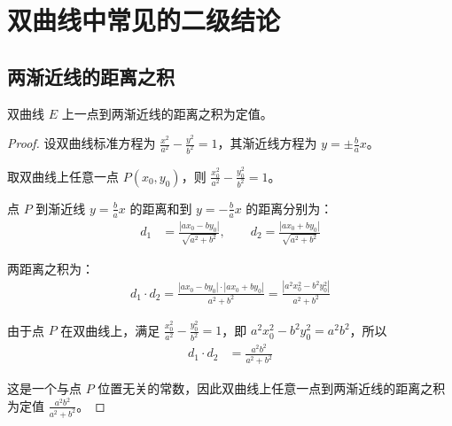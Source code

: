 \section{双曲线中常见的二级结论}

\subsection{两渐近线的距离之积}

\begin{theorem}
    双曲线 $E$ 上一点到两渐近线的距离之积为定值。

    \begin{proof}
        设双曲线标准方程为 $\frac{x^2}{a^2} - \frac{y^2}{b^2} = 1$，其渐近线方程为 $y = \pm \frac{b}{a}x$。

        取双曲线上任意一点 $P(x_0, y_0)$，则 $\frac{x_0^2}{a^2} - \frac{y_0^2}{b^2} = 1$。

        点 $P$ 到渐近线 $y = \frac{b}{a}x$ 的距离和到 $y = -\frac{b}{a}x$ 的距离分别为：
        \begin{align}
            d_1 & = \frac{|ax_0 - by_0|}{\sqrt{a^2 + b^2}}, \quad \quad d_2 = \frac{|ax_0 + by_0|}{\sqrt{a^2 + b^2}}
        \end{align}

        两距离之积为：
        \begin{align}
            d_1 \cdot d_2 = \frac{|ax_0 - by_0| \cdot |ax_0 + by_0|}{a^2 + b^2} = \frac{|a^2x_0^2 - b^2y_0^2|}{a^2 + b^2}
        \end{align}

        由于点 $P$ 在双曲线上，满足 $\frac{x_0^2}{a^2} - \frac{y_0^2}{b^2} = 1$，即 $a^2x_0^2 - b^2y_0^2 = a^2b^2$，所以
        \begin{align}
            d_1 \cdot d_2 & = \frac{a^2b^2}{a^2 + b^2}
        \end{align}

        这是一个与点 $P$ 位置无关的常数，因此双曲线上任意一点到两渐近线的距离之积为定值 $\frac{a^2b^2}{a^2 + b^2}$。
    \end{proof}
\end{theorem}